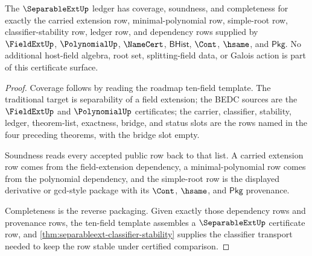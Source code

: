 \begin{theorem}
\label{thm:separableext-ledger-exactness}
The $\SeparableExtUp$ ledger has coverage, soundness, and completeness for exactly the carried extension row, minimal-polynomial row, simple-root row, classifier-stability row, ledger row, and dependency rows supplied by $\FieldExtUp$, $\PolynomialUp$, $\NameCert$, $\mathsf{BHist}$, $\Cont$, $\hsame$, and $\mathsf{Pkg}$. No additional host-field algebra, root set, splitting-field data, or Galois action is part of this certificate surface.
\end{theorem}
\begin{proof}
Coverage follows by reading the roadmap ten-field template. The traditional target is separability of a field extension; the BEDC sources are the $\FieldExtUp$ and $\PolynomialUp$ certificates; the carrier, classifier, stability, ledger, theorem-list, exactness, bridge, and status slots are the rows named in the four preceding theorems, with the bridge slot empty.

Soundness reads every accepted public row back to that list. A carried extension row comes from the field-extension dependency, a minimal-polynomial row comes from the polynomial dependency, and the simple-root row is the displayed derivative or gcd-style package with its $\Cont$, $\hsame$, and $\mathsf{Pkg}$ provenance.

Completeness is the reverse packaging. Given exactly those dependency rows and provenance rows, the ten-field template assembles a $\SeparableExtUp$ certificate row, and \autoref{thm:separableext-classifier-stability} supplies the classifier transport needed to keep the row stable under certified comparison.
\end{proof}

